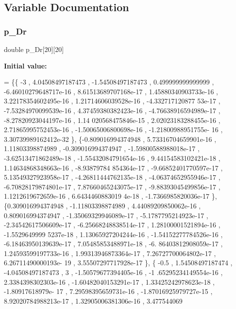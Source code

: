 \subsection{Variable Documentation}
\mbox{\label{a00485_abe48389fdb66f1242c1cc212865f9f9d}} 
\subsubsection{\texorpdfstring{p\+\_\+\+Dr}{p\_Dr}}
{\footnotesize\ttfamily double p\+\_\+\+Dr\mbox{[}20\mbox{]}\mbox{[}20\mbox{]}}

{\bfseries Initial value\+:}
\begin{DoxyCode}
= \{\{               -3 ,  4.04508497187473 , -1.54508497187473 , 0.499999999999999 , -6.46010279648717e-16 ,
       8.61513689707168e-17 , 1.45880340903733e-16 , 3.22178354602495e-16 , 1.21714606039528e-16 , -4.332717120877
      53e-17 , -7.53284970099539e-16 , 4.37459380382423e-16 , -4.76638916594989e-17 , -8.27820923044197e-16 , 1.14
      020568475846e-15 , 2.02023183288455e-16 , 2.71865995752453e-16 , -1.50065006800698e-16 , -1.21800988951755e-
      16 , 3.30739989162412e-32 \},
\{-0.809016994374948 , 5.73316704659901e-16 ,  1.11803398874989 , -0.309016994374947 , -1.59800588988018e-17
       , -3.62513471862489e-18 , -1.55432084791654e-16 , 9.44154583102421e-18 , 1.14634868348663e-16 , -8.93879784
      854364e-17 , -9.66852401770597e-17 , 5.13549327923958e-17 , -4.26811444762135e-18 , -4.06374652955946e-17 , 
      -6.70828179874801e-17 , 7.87660465243075e-17 , -9.88393045499856e-17 , 1.1212619672659e-16 , 6.6434460883019
      4e-18 , -1.7366985820036e-17 \},
\{0.309016994374948 , -1.11803398874989 , 4.44089209850062e-16 , 0.809016994374947 , -1.35069329946089e-17 ,
       -5.1787795214923e-17 , -2.34542617506609e-17 , -6.25668248838514e-17 , 1.28100001521894e-16 , -1.5529649999
      5237e-18 , 1.13065927204244e-16 , -1.54152277784526e-16 , -6.18463950139639e-17 , 7.05485853488971e-18 , -6.
      86403812908059e-17 , 1.24593599197733e-16 , 1.99313946873364e-17 , 7.26727700064802e-17 , 6.26711490000193e-
      19 , 3.55507297717928e-17 \},
\{             -0.5 ,  1.54508497187474 , -4.04508497187473 ,                 3 , -1.50579677394405e-16 , -1
      .65295234149554e-16 , 2.3384398302303e-16 , -1.60482040153291e-17 , 1.33425242978623e-18 , -1.80917618979e-
      17 , 7.29598395659731e-16 , -1.87016925979727e-15 , 8.92020784988213e-17 , 1.32905006381306e-16 , 3.477544069

\end{DoxyCode}

